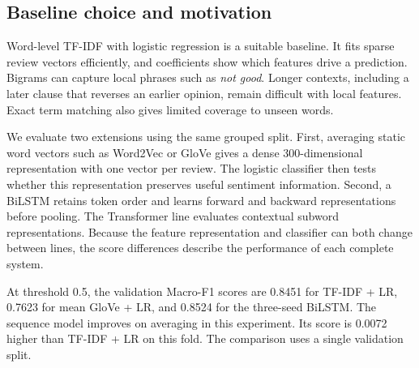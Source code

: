 \subsection{Baseline choice and motivation}\label{sec:baseline}
Word-level TF-IDF with logistic regression is a suitable baseline. It fits sparse
review vectors efficiently, and coefficients show which features drive a prediction.
Bigrams can capture local phrases such as \emph{not good}. Longer contexts,
including a later clause that reverses an earlier opinion, remain difficult
with local features. Exact term matching also gives limited coverage to unseen words.

We evaluate two extensions using the same grouped split. First, averaging static word vectors such as Word2Vec or GloVe\cite{mikolov2013efficient,pennington2014glove} gives a dense 300-dimensional representation
with one vector per review. The logistic classifier then tests whether this
representation preserves useful sentiment information. Second, a BiLSTM retains
token order and learns forward and backward representations before pooling.
The Transformer line evaluates contextual subword representations. Because the
feature representation and classifier can both change between lines, the score
differences describe the performance of each complete system.

At threshold 0.5, the validation Macro-F1 scores are 0.8451 for TF-IDF + LR, 0.7623 for mean GloVe + LR, and 0.8524 for the three-seed BiLSTM. The sequence model improves on averaging in this experiment. Its score is 0.0072 higher than TF-IDF + LR on this fold. The comparison uses a single validation split.
